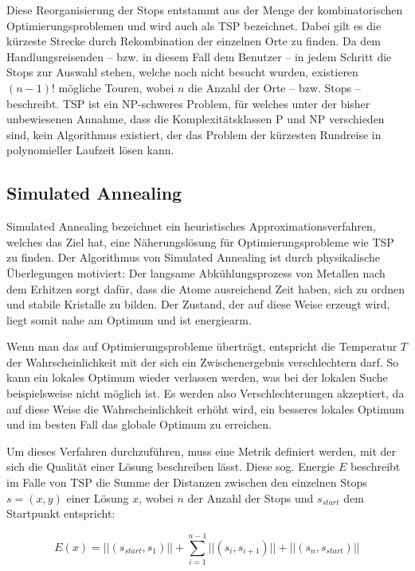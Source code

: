 		Diese Reorganisierung der Stops entstammt aus der Menge der kombinatorischen Optimierungsproblemen und wird auch als \ac{TSP} bezeichnet. Dabei gilt es die kürzeste Strecke durch Rekombination der einzelnen Orte zu finden. Da dem Handlungsreisenden -- bzw. in diesem Fall dem Benutzer -- in jedem Schritt die Stops zur Auswahl stehen, welche noch nicht besucht wurden, existieren $(n - 1)!$ mögliche Touren, wobei $n$ die Anzahl der Orte -- bzw. Stops -- beschreibt. \acs{TSP} ist ein NP-schweres Problem, für welches unter der bisher unbewiesenen Annahme, dass die Komplexitätsklassen P und NP verschieden sind, kein Algorithmus existiert, der das Problem der kürzesten Rundreise in polynomieller Laufzeit lösen kann. \cite{Applegate.2006}
		
		\subsection*{Simulated Annealing}
		
		Simulated Annealing \cite{S.Kirkpatrick.1983} bezeichnet ein heuristisches Approximationsverfahren, welches das Ziel hat, eine Näherungslösung für Optimierungsprobleme wie \acs{TSP} zu finden. Der Algorithmus von Simulated Annealing ist durch physikalische Überlegungen motiviert: Der langsame Abkühlungsprozess von Metallen nach dem Erhitzen sorgt dafür, dass die Atome ausreichend Zeit haben, sich zu ordnen und stabile Kristalle zu bilden. Der Zustand, der auf diese Weise erzeugt wird, liegt somit nahe am Optimum und ist energiearm. 
		
		Wenn man das auf Optimierungsprobleme überträgt, entspricht die Temperatur $T$ der Wahrscheinlichkeit mit der sich ein Zwischenergebnis verschlechtern darf. So kann ein lokales Optimum wieder verlassen werden, was bei der lokalen Suche beispielsweise nicht möglich ist. Es werden also Verschlechterungen akzeptiert, da auf diese Weise die Wahrscheinlichkeit erhöht wird, ein besseres lokales Optimum und im besten Fall das globale Optimum zu erreichen. 
		
		Um dieses Verfahren durchzuführen, muss eine Metrik definiert werden, mit der sich die Qualität einer Lösung beschreiben lässt. Diese sog. Energie $E$ beschreibt im Falle von \acs{TSP} die Summe der Distanzen zwischen den einzelnen Stops $s = (x, y)$ einer Lösung $x$, wobei $n$ der Anzahl der Stops und $s_{start}$ dem Startpunkt entspricht:
		
		\begin{equation}
			E(x) = ||\left(s_{start}, s_1 \right)|| + \sum_{i = 1}^{n - 1} ||\left(s_i, s_{i + 1}\right)|| + ||\left(s_n, s_{start} \right)||
		\end{equation}
			
